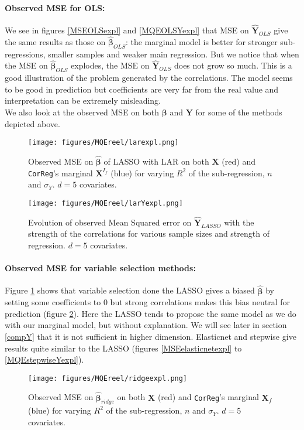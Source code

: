 \documentclass[12pt,a4paper]{report}
\begin{document}
		\paragraph{Observed MSE for OLS:}
	We see in figures \ref{MSEOLSexpl} and \ref{MQEOLSYexpl} that MSE on $\hat{\boldsymbol{Y}}_{OLS}$ give the same results as those on $\hat{\boldsymbol{\beta}}_{OLS}$: the marginal model is better for stronger sub-regressions, smaller samples and weaker main regression. But we notice that when the MSE on $\hat{\boldsymbol{\beta}}_{OLS}$ explodes, the MSE on $\hat{\boldsymbol{Y}}_{OLS}$ does not grow so much. This is a good illustration of the problem generated by the correlations. The model seems to be good in prediction but coefficients are very far from the real value and interpretation can be extremely misleading.\\
 
	
	We also look at the observed MSE on both $\boldsymbol{\beta}$ and $\boldsymbol{Y}$ for some of the methods depicted above.
	
 \begin{figure}[h!]
	\texttt{[image: figures/MQEreel/larexpl.png]}
	\caption{Observed MSE on $\hat{\boldsymbol{\beta}}$ of LASSO with LAR on both $\boldsymbol{X}$ (red) and {\tt CorReg}'s marginal $\boldsymbol{X}^{I_f}$ (blue) for varying $R^2$ of the sub-regression, $n$ and $\sigma_Y$. $d=5$ covariates.}\label{MSElarexpl}
\end{figure} 
	
	 \begin{figure}
	 \centering
	  \texttt{[image: figures/MQEreel/larYexpl.png]}
	  \caption{Evolution of observed Mean Squared error on $\hat{\boldsymbol{Y}}_{LASSO}$ with the strength of the correlations for various sample sizes and strength of regression. $d=5$ covariates. } \label{MQElarYexpl}
	\end{figure}
	
		\paragraph{Observed MSE for variable selection methods:}
	Figure \ref{MSElarexpl} shows that variable selection done the LASSO gives a biased $\hat{\boldsymbol{\beta}}$ by setting some coefficients to 0 but strong correlations makes this bias neutral for prediction (figure \ref{MQElarYexpl}). Here the LASSO tends to propose the same model as we do  with our marginal model, but without explanation. We will see  later in section \ref{compY} that it is not sufficient in higher dimension. Elasticnet and stepwise give results quite similar to the LASSO (figures \ref{MSEelasticnetexpl} to \ref{MQEstepwiseYexpl}). \\
	\begin{figure}[h!]
	\texttt{[image: figures/MQEreel/ridgeexpl.png]}
	\caption{Observed MSE on $\hat{\boldsymbol{\beta}}_{ridge}$ on both $\boldsymbol{X}$ (red) and {\tt CorReg}'s marginal $\boldsymbol{X}_f$ (blue) for varying $R^2$ of the sub-regression, $n$ and $\sigma_Y$. $d=5$ covariates.}\label{MSEridgexpl}
\end{figure} 
	
\end{document}

